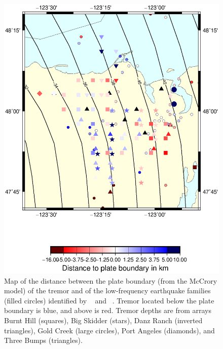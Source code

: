 \documentclass[draft]{agujournal2019}
\begin{document}
\begin{figure}
\noindent\includegraphics[width=\textwidth, trim={1cm 5cm 3.5cm 4cm},clip]{figures/d_to_pb_PWS_PWS_P.eps}
\caption{Map of the distance between the plate boundary (from the McCrory model) of the tremor and of the low-frequency earthquake families (filled circles) identified by ~ and ~. Tremor located below the plate boundary is blue, and above is red. Tremor depths are from arrays Burnt Hill (squares), Big Skidder (stars), Danz Ranch (inverted triangles),  Gold Creek (large circles), Port Angeles (diamonds), and Three Bumps (triangles).}
\label{pngfiguresample}
\end{figure}
\end{document}
